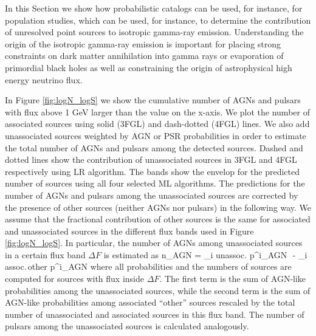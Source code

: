 In this Section we show how probabilistic catalogs can be used, for instance, for population studies,
which can be used, for instance, to determine the contribution of unresolved point sources to isotropic gamma-ray emission.
Understanding the origin of the isotropic gamma-ray emission is important for placing strong constraints
on dark matter annihilation into gamma rays or evaporation of primordial black holes
as well as constraining the origin of astrophysical high energy neutrino flux.

In Figure \ref{fig:logN_logS} we show the cumulative number of AGNs and pulsars with flux above 1 GeV larger than the
value on the x-axis.
We plot the number of associated sources using solid (3FGL) and dash-dotted (4FGL) lines.
We also add unassociated sources weighted by AGN or PSR probabilities in order to estimate the total number of AGNs and pulsars
among the detected sources.
Dashed and dotted lines show the contribution of unassociated sources in 3FGL and 4FGL respectively using LR algorithm.
The bands show the envelop for the predicted number of sources using all four selected ML algorithms.
The predictions for the number of AGNs and pulsars among the unassociated sources are corrected by the presence of other sources (neither AGNs nor pulsars) in the following way.
We assume that the fractional contribution of other sources is the same for associated and unassociated sources in the different flux bands used in Figure \ref{fig:logN_logS}.
In particular, the number of AGNs among unassociated sources in a certain flux band $\Delta F$ is estimated as
\be
n_{\rm AGN} = \sum_{i \in \rm unassoc.} p^i_{\rm AGN}\,\, - \sum_{i \in \rm assoc.\,other} p^i_{\rm AGN} \cdot {}
\ee
where all probabilities and the numbers of sources are computed for sources with flux inside $\Delta F$.
The first term is the sum of AGN-like probabilities among the unassociated sources,
while the second term is the sum of AGN-like probabilities among associated ``other'' sources rescaled by the total number
of unassociated and associated sources in this flux band.
The number of pulsars among the unassociated sources is calculated analogously.

